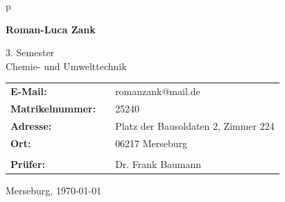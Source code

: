 \begin{center}
\begin{tabular}{p{\textwidth}}
\begin{center}
\Large{\textbf{Roman-Luca Zank}} \\
\end{center}

\begin{center}
3. Semester \\
Chemie- und Umwelttechnik \\
\end{center}


\begin{center}
\begin{tabular}{lll}
	\textbf{E-Mail:} & & romanzank@mail.de\\
	\textbf{Matrikelnummer:} & &25240\\
	\textbf{Adresse:} & &Platz der Bausoldaten 2, Zimmer 224\\
	\textbf{Ort:} & &06217 Merseburg\\
	&& \\
	\textbf{Prüfer:} & & Dr. Frank  Baumann\\
\end{tabular}
\end{center}

\vfill

\large{Merseburg, \today}

\end{tabular}
\end{center}
